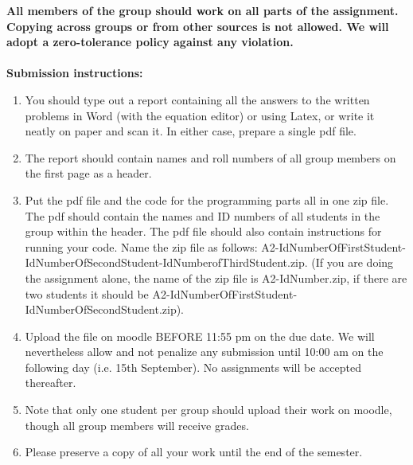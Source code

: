 \documentclass[11pt]{article}
\begin{document}
\maketitle

\textbf{All members of the group should work on all parts of the assignment. Copying across groups or from other sources is not allowed. We will adopt a \textbf{zero-tolerance policy} against any violation.}
\\
\\
\textbf{Submission instructions:} 
\begin{enumerate}
\item You should type out a report containing all the answers to the written problems in Word (with the equation editor) or using Latex, or write it neatly on paper and scan it. In either case, prepare a single pdf file. 
\item The report should contain names and roll numbers of all group members on the first page as a header.
\item Put the pdf file and the code for the programming parts all in one zip file. The pdf should contain the names and ID numbers of all students in the group within the header. The pdf file should also contain instructions for running your code. Name the zip file as follows: A2-IdNumberOfFirstStudent-IdNumberOfSecondStudent-IdNumberofThirdStudent.zip. (If you are doing the assignment alone, the name of the zip file is A2-IdNumber.zip, if there are two students it should be A2-IdNumberOfFirstStudent-IdNumberOfSecondStudent.zip). 
\item Upload the file on moodle BEFORE 11:55 pm on the due date. We will nevertheless allow and not penalize any submission until 10:00 am on the following day (i.e. 15th September). No assignments will be accepted thereafter. 
\item Note that only one student per group should upload their work on moodle, though all group members will receive grades. 
\item Please preserve a copy of all your work until the end of the semester. 
\end{enumerate}
\end{document}
